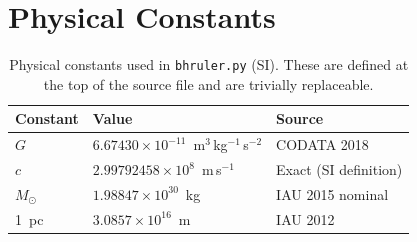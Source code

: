 \documentclass[11pt]{article}
\begin{document}
\section{Physical Constants}\label{app:constants}

\begin{table}[htbp]
\centering
\caption{Physical constants used in \texttt{bhruler.py} (SI).
These are defined at the top of the source file and are trivially replaceable.}
\label{tab:constants}
\begin{tabular}{@{}lll@{}}
\toprule
Constant & Value & Source \\
\midrule
$G$ & $6.67430\times 10^{-11}$~m$^3$\,kg$^{-1}$\,s$^{-2}$ & CODATA 2018 \\
$c$ & $2.99792458\times 10^{8}$~m\,s$^{-1}$ & Exact (SI definition) \\
$M_\odot$ & $1.98847\times 10^{30}$~kg & IAU 2015 nominal \\
1~pc & $3.0857\times 10^{16}$~m & IAU 2012 \\
\bottomrule
\end{tabular}
\end{table}
\end{document}
